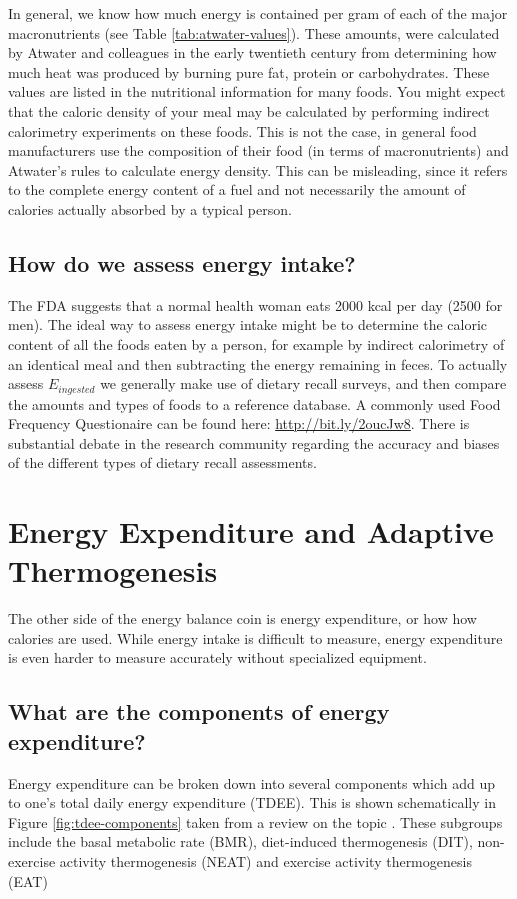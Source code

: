 \documentclass{tufte-handout}
\begin{document}
In general, we know how much energy is contained per gram of each of the major macronutrients (see Table \ref{tab:atwater-values}).  These amounts, were calculated by Atwater and colleagues in the early twentieth century from determining how much heat was produced by burning pure fat, protein or carbohydrates.  These values are listed in the nutritional information for many foods.  You might expect that the caloric density of your meal may be calculated by performing indirect calorimetry experiments on these foods.  This is not the case, in general food manufacturers use the composition of their food (in terms of macronutrients) and Atwater's rules to calculate energy density.  This can be misleading, since it refers to the complete energy content of a fuel and not necessarily the amount of calories actually absorbed by a typical person.

\subsection{How do we assess energy intake?}

The FDA suggests that a normal health woman eats 2000 kcal per day (2500 for men).  The ideal way to assess energy intake might be to determine the caloric content of all the foods eaten by a person, for example by indirect calorimetry of an identical meal and then subtracting the energy remaining in feces.   To actually assess $E_{ingested}$ we generally make use of dietary recall surveys, and then compare the amounts and types of foods to a reference database.  A commonly used Food Frequency Questionaire can be found here: \url{http://bit.ly/2oucJw8}.  There is substantial debate in the research community regarding the accuracy and biases of the different types of dietary recall assessments.


\section{Energy Expenditure and Adaptive Thermogenesis}

The other side of the energy balance coin is energy expenditure, or how how calories are used.  While energy intake is difficult to measure, energy expenditure is even harder to measure accurately without specialized equipment.  
\subsection{What are the components of energy expenditure?}
Energy expenditure can be broken down into several components which add up to one's total daily energy expenditure (TDEE).  This is shown schematically in Figure \ref{fig:tdee-components} taken from a review on the topic \citep{Tam2015}.  These subgroups include the basal metabolic rate (BMR), diet-induced thermogenesis (DIT), non-exercise activity thermogenesis (NEAT) and exercise activity thermogenesis (EAT)
\end{document}
